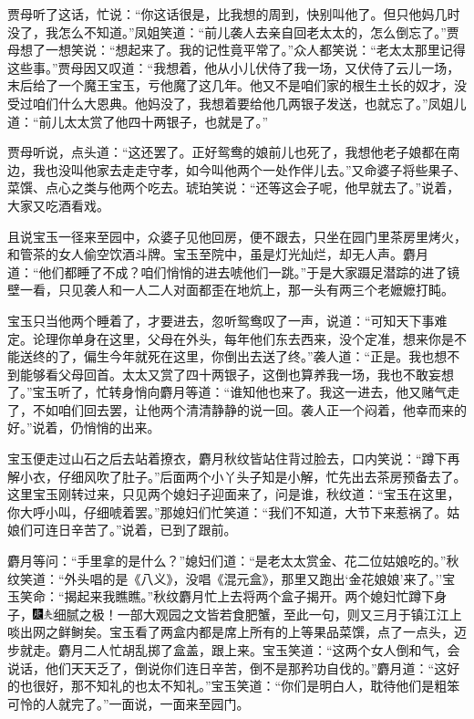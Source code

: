 贾母听了这话，忙说：``你这话很是，比我想的周到，快别叫他了。但只他妈几时没了，我怎么不知道。''凤姐笑道：``前儿袭人去亲自回老太太的，怎么倒忘了。''贾母想了一想笑说：``想起来了。我的记性竟平常了。''众人都笑说：``老太太那里记得这些事。''贾母因又叹道：``我想着，他从小儿伏侍了我一场，又伏侍了云儿一场，末后给了一个魔王宝玉，亏他魔了这几年。他又不是咱们家的根生土长的奴才，没受过咱们什么大恩典。他妈没了，我想着要给他几两银子发送，也就忘了。''凤姐儿道：``前儿太太赏了他四十两银子，也就是了。''

贾母听说，点头道：``这还罢了。正好鸳鸯的娘前儿也死了，我想他老子娘都在南边，我也没叫他家去走走守孝，如今叫他两个一处作伴儿去。''又命婆子将些果子、菜馔、点心之类与他两个吃去。琥珀笑说：``还等这会子呢，他早就去了。''说着，大家又吃酒看戏。

且说宝玉一径来至园中，众婆子见他回房，便不跟去，只坐在园门里茶房里烤火，和管茶的女人偷空饮酒斗牌。宝玉至院中，虽是灯光灿烂，却无人声。麝月道：``他们都睡了不成？咱们悄悄的进去唬他们一跳。''于是大家蹑足潜踪的进了镜壁一看，只见袭人和一人二人对面都歪在地炕上，那一头有两三个老嬷嬷打盹。

宝玉只当他两个睡着了，才要进去，忽听鸳鸯叹了一声，说道：``可知天下事难定。论理你单身在这里，父母在外头，每年他们东去西来，没个定准，想来你是不能送终的了，偏生今年就死在这里，你倒出去送了终。''袭人道：``正是。我也想不到能够看父母回首。太太又赏了四十两银子，这倒也算养我一场，我也不敢妄想了。''宝玉听了，忙转身悄向麝月等道：``谁知他也来了。我这一进去，他又赌气走了，不如咱们回去罢，让他两个清清静静的说一回。袭人正一个闷着，他幸而来的好。''说着，仍悄悄的出来。

宝玉便走过山石之后去站着撩衣，麝月秋纹皆站住背过脸去，口内笑说：``蹲下再解小衣，仔细风吹了肚子。''后面两个小丫头子知是小解，忙先出去茶房预备去了。这里宝玉刚转过来，只见两个媳妇子迎面来了，问是谁，秋纹道：``宝玉在这里，你大呼小叫，仔细唬着罢。''那媳妇们忙笑道：``我们不知道，大节下来惹祸了。姑娘们可连日辛苦了。''说着，已到了跟前。

麝月等问：``手里拿的是什么？''媳妇们道：``是老太太赏金、花二位姑娘吃的。''秋纹笑道：``外头唱的是《八义》，没唱《混元盒》，那里又跑出`金花娘娘'来了。''宝玉笑命：``揭起来我瞧瞧。''秋纹麝月忙上去将两个盒子揭开。两个媳妇忙蹲下身子，{\includegraphics[width=3mm]{../Images/00004}\includegraphics[width=3mm]{../Images/00012}\footnotesize \kaishu 细腻之极！一部大观园之文皆若食肥蟹，至此一句，则又三月于镇江江上啖出网之鲜鲥矣。}宝玉看了两盒内都是席上所有的上等果品菜馔，点了一点头，迈步就走。麝月二人忙胡乱掷了盒盖，跟上来。宝玉笑道：``这两个女人倒和气，会说话，他们天天乏了，倒说你们连日辛苦，倒不是那矜功自伐的。''麝月道：``这好的也很好，那不知礼的也太不知礼。''宝玉笑道：``你们是明白人，耽待他们是粗笨可怜的人就完了。''一面说，一面来至园门。

